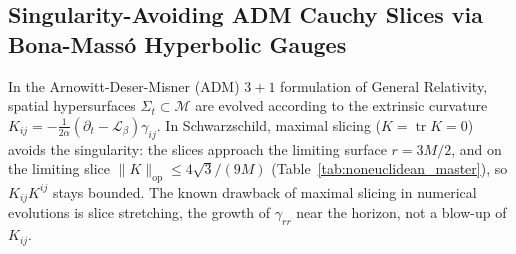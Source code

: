 \documentclass[11pt,reqno]{amsart}
\theoremstyle{definition}
\newcommand{\op}{\mathrm{op}}
\numberwithin{equation}{section}
\begin{document}
\subsection{Singularity-Avoiding ADM Cauchy Slices via Bona-Mass\'o Hyperbolic Gauges}
\label{subsec:singularity_avoiding_adm}
In the Arnowitt-Deser-Misner (ADM) $3+1$ formulation of General Relativity, spatial hypersurfaces $\Sigma_t \subset \mathcal{M}$ are evolved according to the extrinsic curvature $K_{ij} = -\frac{1}{2\alpha} (\partial_t - \mathcal{L}_\beta) \gamma_{ij}$. In Schwarzschild, maximal slicing ($K = \operatorname{tr} K = 0$) avoids the singularity: the slices approach the limiting surface $r = 3M/2$, and on the limiting slice $\|K\|_{\op} \le 4\sqrt3/(9M)$ (Table~\ref{tab:noneuclidean_master}), so $K_{ij}K^{ij}$ stays bounded. The known drawback of maximal slicing in numerical evolutions is slice stretching, the growth of $\gamma_{rr}$ near the horizon, not a blow-up of $K_{ij}$.
\end{document}

